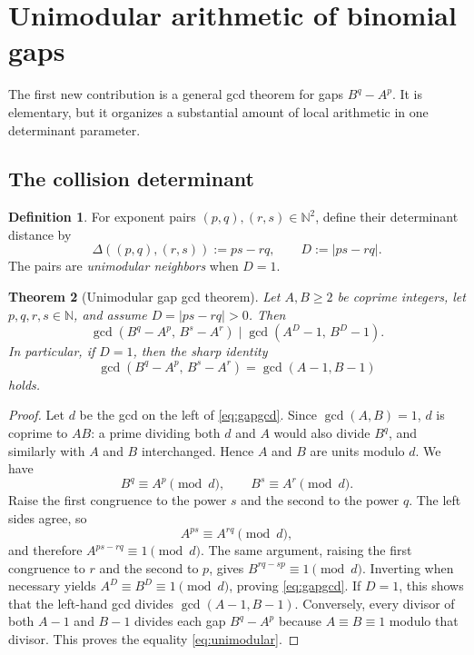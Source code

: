 \documentclass[11pt,oneside]{article}
\newtheorem{theorem}{Theorem}[section]
\theoremstyle{definition}
\newtheorem{definition}[theorem]{Definition}
\theoremstyle{remark}
\newcommand{\N}{\mathbb N}
\newcommand{\abs}[1]{\left|#1\right|}
\begin{document}
\section{Unimodular arithmetic of binomial gaps}
\label{sec:gaps}

The first new contribution is a general gcd theorem for gaps $B^q-A^p$.  It
is elementary, but it organizes a substantial amount of local arithmetic in
one determinant parameter.

\subsection{The collision determinant}

\begin{definition}
For exponent pairs $(p,q),(r,s)\in\N^2$, define their determinant distance by
\[
  \Delta((p,q),(r,s)):=ps-rq,
  \qquad D:=\abs{ps-rq}.
\]
The pairs are \emph{unimodular neighbors} when $D=1$.
\end{definition}

\begin{theorem}[Unimodular gap gcd theorem]
\label{thm:gapgcd}
Let $A,B\ge2$ be coprime integers, let $p,q,r,s\in\N$, and assume
$D=\abs{ps-rq}>0$.  Then
\begin{equation}
 \gcd(B^q-A^p,\,B^s-A^r)
 \mid \gcd(A^D-1,\,B^D-1).
 \label{eq:gapgcd}
\end{equation}
In particular, if $D=1$, then the sharp identity
\begin{equation}
 \gcd(B^q-A^p,\,B^s-A^r)
 = \gcd(A-1,B-1)
 \label{eq:unimodular}
\end{equation}
holds.
\end{theorem}

\begin{proof}
Let $d$ be the gcd on the left of \eqref{eq:gapgcd}.  Since $\gcd(A,B)=1$,
$d$ is coprime to $AB$: a prime dividing both $d$ and $A$ would also divide
$B^q$, and similarly with $A$ and $B$ interchanged.  Hence $A$ and $B$ are
units modulo $d$.  We have
\[
  B^q\equiv A^p\pmod d,\qquad B^s\equiv A^r\pmod d.
\]
Raise the first congruence to the power $s$ and the second to the power $q$.
The left sides agree, so
\[
 A^{ps}\equiv A^{rq}\pmod d,
\]
and therefore $A^{ps-rq}\equiv1\pmod d$.  The same argument, raising the
first congruence to $r$ and the second to $p$, gives
$B^{rq-sp}\equiv1\pmod d$.  Inverting when necessary yields
$A^D\equiv B^D\equiv1\pmod d$, proving \eqref{eq:gapgcd}.  If $D=1$,
this shows that the left-hand gcd divides $\gcd(A-1,B-1)$.  Conversely,
every divisor of both $A-1$ and $B-1$ divides each gap $B^q-A^p$ because
$A\equiv B\equiv1$ modulo that divisor.  This proves the equality
\eqref{eq:unimodular}.
\end{proof}
\end{document}
